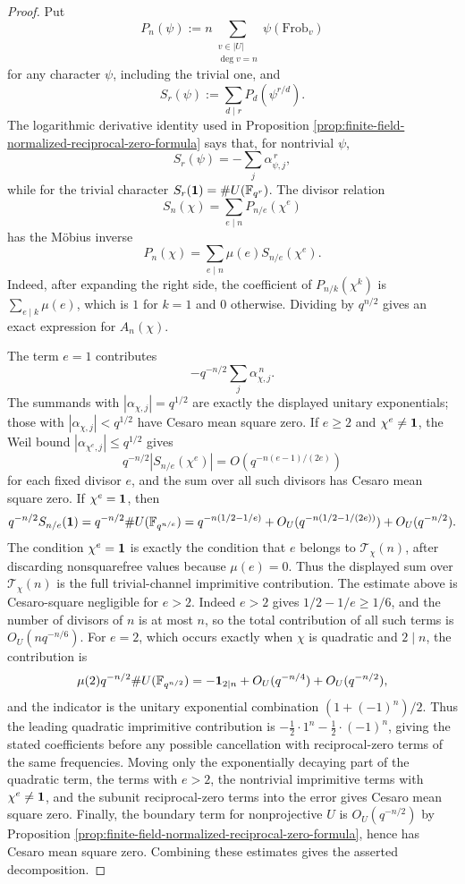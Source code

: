 \begin{proof}
Put
\[
P_n(\psi):=n\sum_{\substack{v\in |U|\\ \deg v=n}}\psi(\mathrm{Frob}_v)
\]
for any character \(\psi\), including the trivial one, and
\[
S_r(\psi):=\sum_{d\mid r}P_d(\psi^{r/d}).
\]
The logarithmic derivative identity used in Proposition \ref{prop:finite-field-normalized-reciprocal-zero-formula} says that, for nontrivial \(\psi\),
\[
S_r(\psi)=-\sum_j\alpha_{\psi,j}^{\,r},
\]
while for the trivial character \(S_r(\mathbf{1})=\#U(\mathbb{F}_{q^r})\). The divisor relation
\[
S_n(\chi)=\sum_{e\mid n}P_{n/e}(\chi^e)
\]
has the M\"obius inverse
\[
P_n(\chi)=\sum_{e\mid n}\mu(e)S_{n/e}(\chi^e).
\]
Indeed, after expanding the right side, the coefficient of \(P_{n/k}(\chi^k)\) is \(\sum_{e\mid k}\mu(e)\), which is \(1\) for \(k=1\) and \(0\) otherwise. Dividing by \(q^{n/2}\) gives an exact expression for \(A_n(\chi)\).

The term \(e=1\) contributes
\[
-q^{-n/2}\sum_j\alpha_{\chi,j}^{\,n}.
\]
The summands with \(|\alpha_{\chi,j}|=q^{1/2}\) are exactly the displayed unitary exponentials; those with \(|\alpha_{\chi,j}|<q^{1/2}\) have Cesaro mean square zero. If \(e\ge2\) and \(\chi^e\ne\mathbf{1}\), the Weil bound \(|\alpha_{\chi^e,j}|\le q^{1/2}\) gives
\[
q^{-n/2}|S_{n/e}(\chi^e)|=O(q^{-n(e-1)/(2e)})
\]
for each fixed divisor \(e\), and the sum over all such divisors has Cesaro mean square zero. If \(\chi^e=\mathbf{1}\), then
\[
q^{-n/2}S_{n/e}(\mathbf{1})=q^{-n/2}\#U(\mathbb{F}_{q^{n/e}})=q^{-n(1/2-1/e)}+O_U(q^{-n(1/2-1/(2e))})+O_U(q^{-n/2}).
\]
The condition \(\chi^e=\mathbf{1}\) is exactly the condition that \(e\) belongs to \(\mathcal T_\chi(n)\), after discarding nonsquarefree values because \(\mu(e)=0\). Thus the displayed sum over \(\mathcal T_\chi(n)\) is the full trivial-channel imprimitive contribution. The estimate above is Cesaro-square negligible for \(e>2\). Indeed \(e>2\) gives \(1/2-1/e\ge1/6\), and the number of divisors of \(n\) is at most \(n\), so the total contribution of all such terms is \(O_U(nq^{-n/6})\). For \(e=2\), which occurs exactly when \(\chi\) is quadratic and \(2\mid n\), the contribution is
\[
\mu(2)q^{-n/2}\#U(\mathbb{F}_{q^{n/2}})=-\mathbf 1_{2\mid n}+O_U(q^{-n/4})+O_U(q^{-n/2}),
\]
and the indicator is the unitary exponential combination \((1+(-1)^n)/2\). Thus the leading quadratic imprimitive contribution is \(-\frac12\cdot 1^n-\frac12\cdot(-1)^n\), giving the stated coefficients before any possible cancellation with reciprocal-zero terms of the same frequencies. Moving only the exponentially decaying part of the quadratic term, the terms with \(e>2\), the nontrivial imprimitive terms with \(\chi^e\ne\mathbf{1}\), and the subunit reciprocal-zero terms into the error gives Cesaro mean square zero. Finally, the boundary term for nonprojective \(U\) is \(O_U(q^{-n/2})\) by Proposition \ref{prop:finite-field-normalized-reciprocal-zero-formula}, hence has Cesaro mean square zero. Combining these estimates gives the asserted decomposition.
\end{proof}

